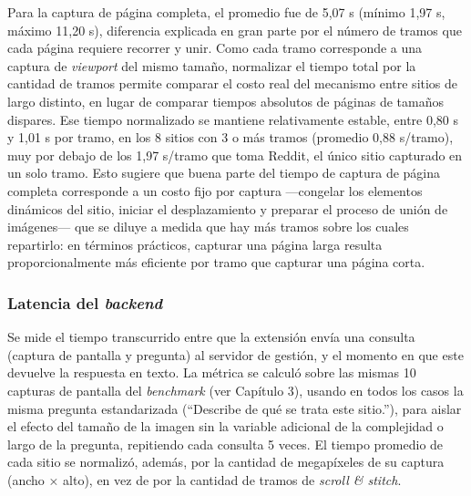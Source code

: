 Para la captura de página completa, el promedio fue de 5,07 s (mínimo 1,97 s, máximo 11,20 s), diferencia explicada en gran parte por el número de tramos que cada página requiere recorrer y unir. Como cada tramo corresponde a una captura de \textit{viewport} del mismo tamaño, normalizar el tiempo total por la cantidad de tramos permite comparar el costo real del mecanismo entre sitios de largo distinto, en lugar de comparar tiempos absolutos de páginas de tamaños dispares. Ese tiempo normalizado se mantiene relativamente estable, entre 0,80 s y 1,01 s por tramo, en los 8 sitios con 3 o más tramos (promedio 0,88 s/tramo), muy por debajo de los 1,97 s/tramo que toma Reddit, el único sitio capturado en un solo tramo. Esto sugiere que buena parte del tiempo de captura de página completa corresponde a un costo fijo por captura —congelar los elementos dinámicos del sitio, iniciar el desplazamiento y preparar el proceso de unión de imágenes— que se diluye a medida que hay más tramos sobre los cuales repartirlo: en términos prácticos, capturar una página larga resulta proporcionalmente más eficiente por tramo que capturar una página corta.

\subsubsection{Latencia del \textit{backend}}

Se mide el tiempo transcurrido entre que la extensión envía una consulta (captura de pantalla y pregunta) al servidor de gestión, y el momento en que este devuelve la respuesta en texto. La métrica se calculó sobre las mismas 10 capturas de pantalla del \textit{benchmark} (ver Capítulo 3), usando en todos los casos la misma pregunta estandarizada (``Describe de qué se trata este sitio.''), para aislar el efecto del tamaño de la imagen sin la variable adicional de la complejidad o largo de la pregunta, repitiendo cada consulta 5 veces. El tiempo promedio de cada sitio se normalizó, además, por la cantidad de megapíxeles de su captura (ancho × alto), en vez de por la cantidad de tramos de \textit{scroll \& stitch}.

